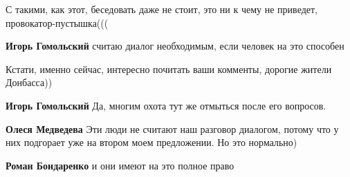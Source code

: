 \begin{itemize}
\begin{itemize}
С такими, как этот, беседовать даже не стоит, это ни к чему не приведет, провокатор-пустышка(((

 
\textbf{Игорь Гомольский} считаю диалог необходимым, если человек на это способен

 
Кстати, именно сейчас, интересно почитать ваши комменты, дорогие жители Донбасса))

 
\textbf{Игорь Гомольский} Да, многим охота тут же отмыться после его вопросов.

 
\textbf{Олеся Медведева} Эти люди не считают наш разговор диалогом, потому что
у них подгорает уже на втором моем предложении. Но это нормально)

 
\textbf{Роман Бондаренко} и они имеют на это полное право

 

\end{itemize}
\end{itemize}
